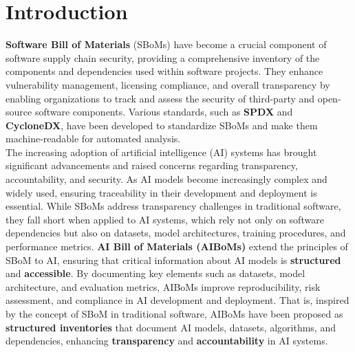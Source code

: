 \documentclass[12pt,a4paper, oneside, openright]{book}
\newcommand{\aiboms}{{AIBoMs}\xspace}
\newcommand{\sbom}{{SBoM}\xspace}
\newcommand{\sboms}{{SBoMs}\xspace}
\begin{document}
\tableofcontents  %
\newpage %
\setcounter{chapter}{0} %

\chapter{Introduction}

\textbf{Software Bill of Materials} (\sboms) have become a crucial component of software supply chain security, providing a comprehensive inventory of the components and dependencies used within software projects. They enhance vulnerability management, licensing compliance, and overall transparency by enabling organizations to track and assess the security of third-party and open-source software components. Various standards, such as \textbf{SPDX} and \textbf{CycloneDX}, have been developed to standardize \sboms and make them machine-readable for automated analysis.\\
The increasing adoption of artificial intelligence (AI) systems has brought significant advancements and raised concerns regarding transparency, accountability, and security. As AI models become increasingly complex and widely used, ensuring traceability in their development and deployment is essential. While \sboms address transparency challenges in traditional software, they fall short when applied to AI systems, which rely not only on software dependencies but also on datasets, model architectures, training procedures, and performance metrics. \textbf{AI Bill of Materials (\aiboms)} extend the principles of \sbom to AI, ensuring that critical information about AI models is \textbf{structured} and \textbf{accessible}. By documenting key elements such as datasets, model architecture, and evaluation metrics, \aiboms improve reproducibility, risk assessment, and compliance in AI development and deployment. That is, inspired by the concept of \sbom in traditional software, \aiboms have been proposed as \textbf{structured inventories} that document AI models, datasets, algorithms, and dependencies, enhancing \textbf{transparency} and \textbf{accountability} in AI systems.
\end{document}
